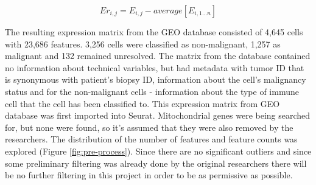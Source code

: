 \documentclass[11pt]{article}
\begin{document}
\begin{multicols}{2}
    $$Er_{i,j}=E_{i,j} - average[E_{i,1...n}]$$

    The resulting expression matrix from the GEO database consisted of 4,645 cells with 23,686 features. 3,256 cells were classified as non-malignant, 1,257 as malignant and 132 remained unresolved. The matrix from the database contained no information about technical variables, but had metadata with tumor ID that is synonymous with patient's biopsy ID, information about the cell's malignancy status and for the non-malignant cells - information about the type of immune cell that the cell has been classified to. This expression matrix from GEO database was first imported into Seurat. Mitochondrial genes were being searched for, but none were found, so it's assumed that they were also removed by the researchers. The distribution of the number of features and feature counts was explored (Figure \ref{fig:pre-process}). Since there are no significant outliers and since some preliminary filtering was already done by the original researchers there will be no further filtering in this project in order to be as permissive as possible.
    
\end{multicols}
\end{document}
